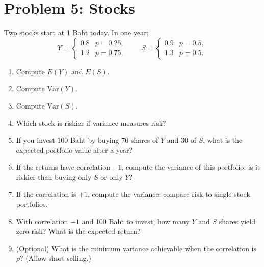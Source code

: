 \section*{Problem 5: Stocks}
Two stocks start at 1 Baht today. In one year:
\[
Y = \begin{cases}
0.8 & p=0.25,\\
1.2 & p=0.75,
\end{cases}\qquad
S = \begin{cases}
0.9 & p=0.5,\\
1.3 & p=0.5.
\end{cases}
\]
\begin{enumerate}[label=\arabic*.]
    \item Compute $E(Y)$ and $E(S)$.
    \item Compute $\mathrm{Var}(Y)$.
    \item Compute $\mathrm{Var}(S)$.
    \item Which stock is riskier if variance measures risk?
    \item If you invest 100 Baht by buying 70 shares of $Y$ and 30 of $S$, what is the expected portfolio value after a year?
    \item If the returns have correlation $-1$, compute the variance of this portfolio; is it riskier than buying only $S$ or only $Y$?
    \item If the correlation is $+1$, compute the variance; compare risk to single-stock portfolios.
    \item With correlation $-1$ and 100 Baht to invest, how many $Y$ and $S$ shares yield zero risk? What is the expected return?
    \item (Optional) What is the minimum variance achievable when the correlation is $\rho$? (Allow short selling.)
\end{enumerate}

\medskip
\solution

